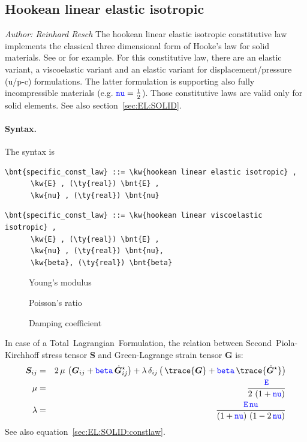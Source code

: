 \subsection{Hookean linear elastic isotropic}
\label{sec:CL:hookean:linear:elastic:isotropic}
\emph{Author: Reinhard Resch} The hookean linear elastic isotropic constitutive law implements the classical
three dimensional form of Hooke's law for solid materials.
See \cite{BATHE2016} or \cite{WALLRAPP1998} for example.
For this constitutive law, there are an elastic variant, a viscoelastic variant
and an elastic variant for displacement/pressure (u/p-c) formulations.
The latter formulation is supporting also fully incompressible materials (e.g. $\textcolor{blue}{\texttt{nu}} = \frac{1}{2}$).
Those constitutive laws are valid only for solid elements. See also section~\ref{sec:EL:SOLID}.

\paragraph{Syntax.}
The syntax is
\begin{Verbatim}[commandchars=\\\{\}]
    \bnt{specific_const_law} ::= \kw{hookean linear elastic isotropic} ,
      \kw{E} , (\ty{real}) \bnt{E} ,
      \kw{nu} , (\ty{real}) \bnt{nu}
\end{Verbatim}

\begin{Verbatim}[commandchars=\\\{\}]
    \bnt{specific_const_law} ::= \kw{hookean linear viscoelastic isotropic} ,
      \kw{E} , (\ty{real}) \bnt{E} ,
      \kw{nu} , (\ty{real}) \bnt{nu},
      \kw{beta}, (\ty{real}) \bnt{beta}
\end{Verbatim}

\begin{description}
\item[] Young's modulus
\item[] Poisson's ratio
\item[] Damping coefficient
\end{description}
In case of a Total~Lagrangian~Formulation, the relation between Second~Piola-Kirchhoff stress tensor $\boldsymbol{S}$
and Green-Lagrange strain tensor $\boldsymbol{G}$ is:
\begin{eqnarray}
  \boldsymbol{S}_{ij} & = & 2 \, \mu \, \left(\boldsymbol{G}_{ij} + \nt{beta} \, \dot{\boldsymbol{G}}_{ij}^{\star} \right) + \lambda \, \delta_{ij} \left( \, \trace{\boldsymbol{G}} + \nt{beta} \, \trace{\dot{\boldsymbol{G}}^{\star}}\right) \label{SEC:CL:hookean:sigma} \\
  \mu & = & \frac{\nt{E}}{2 \, \left(1 + \nt{nu}\right)} \\
  \lambda & = & \frac{\nt{E} \, \nt{nu}}{\left(1 + \nt{nu}\right) \, \left(1 - 2 \, \nt{nu} \right)}
\end{eqnarray}
See also equation~\ref{sec:EL:SOLID:constlaw}.

